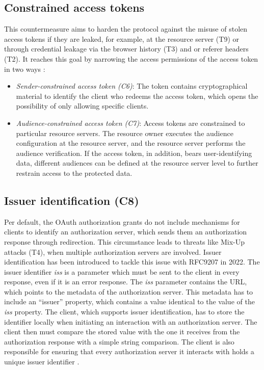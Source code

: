 \documentclass[
    fontsize=12pt,
    headings=small,
    parskip=half,           %
    bibliography=totoc,
    numbers=noenddot,       %
    open=any,               %
    ]{scrreprt}
\begin{document}
\subsection{Constrained access tokens}
\label{counter:C6_7}
This countermeasure aims to harden the protocol against the misuse of stolen access tokens if they are leaked, for example, at the resource server (T9) or through credential leakage via the browser history (T3) and or referer headers (T2). It reaches this goal by narrowing the access permissions of the access token in two ways \cite{lodderstedt2020oauth}:
\begin{itemize}
	\item \emph{Sender-constrained access token (C6)}: The token contains cryptographical material to identify the client who redeems the access token, which opens the possibility of only allowing specific clients.
	\item \emph{Audience-constrained access token (C7)}: Access tokens are constrained to particular resource servers. The resource owner executes the audience configuration at the resource server, and the resource server performs the audience verification. If the access token, in addition, bears user-identifying data, different audiences can be defined at the resource server level to further restrain access to the protected data.
\end{itemize}

 
\subsection[Issuer identification]{Issuer identification (C8)}
\label{counter:C8}
Per default, the OAuth authorization grants do not include mechanisms for clients to identify an authorization server, which sends them an authorization response through redirection. This circumstance leads to threats like Mix-Up attacks (T4), when multiple authorization servers are involved. Issuer identification has been introduced to tackle this issue with RFC9207 in 2022. The issuer identifier \emph {iss} is a parameter which must be sent to the client in every response, even if it is an error response. The \emph{iss} parameter contains the URL, which points to the metadata of the authorization server. This metadata has to include an ``issuer'' property, which contains a value identical to the value of the \emph{iss} property. The client, which supports issuer identification, has to store the identifier locally when initiating an interaction with an authorization server. The client then must compare the stored value with the one it receives from the authorization response with a simple string comparison. The client is also responsible for ensuring that every authorization server it interacts with holds a unique issuer identifier \cite{meyer2022rfc}.
\end{document}
